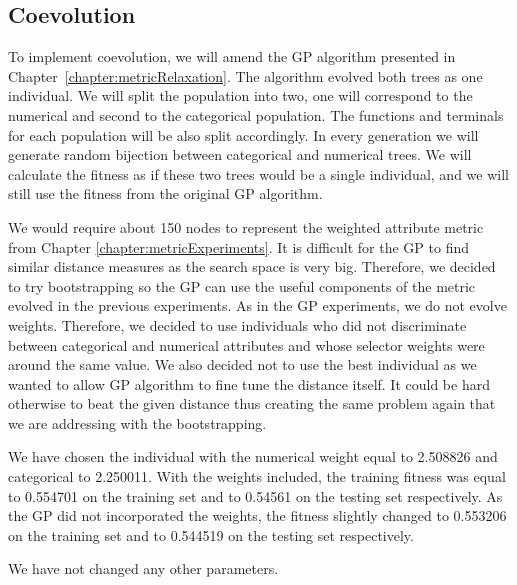  \subsection{Coevolution}
 To implement coevolution, we will amend the GP algorithm presented in Chapter~\ref{chapter:metricRelaxation}. The algorithm evolved both trees as one individual. We will split the population into two, one will correspond to the numerical and second to the categorical population. The functions and terminals for each population will be also split accordingly. In every generation we will generate random bijection between categorical and numerical trees. We will calculate the fitness as if these two trees would be a single individual, and we will still use the fitness from the original GP algorithm. 
 
 We would require about 150 nodes to represent the weighted attribute metric from Chapter \ref{chapter:metricExperiments}. It is difficult for the GP to find similar distance measures as the search space is very big. Therefore, we decided to try bootstrapping so the GP can use the useful components of the metric evolved in the previous experiments. As in the GP experiments, we do not evolve weights. Therefore, we decided to use individuals who did not discriminate between categorical and numerical attributes and whose selector weights were around the same value. We also decided not to use the best individual as we wanted to allow GP algorithm to fine tune the distance itself. It could be hard otherwise to beat the given distance thus creating the same problem again that we are addressing with the bootstrapping.
 
 We have chosen the individual with the numerical weight equal to 2.508826 and categorical to 2.250011. With the weights included, the training fitness was equal to 0.554701 on the training set and to 0.54561 on the testing set respectively.
 As the GP did not incorporated the weights, the fitness slightly changed to 0.553206 on the training set and to 0.544519 on the testing set respectively.
 
 We have not changed any other parameters. 
 
